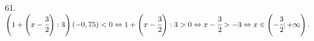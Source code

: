 61. $\left(1+\left(x-\cfrac{3}{2}\right):3\right)\left(-0,75\right)<0\Leftrightarrow1+\left(x-\cfrac{3}{2}\right):3>0\Leftrightarrow
x-\cfrac{3}{2}>-3\Leftrightarrow x\in  \left(-\cfrac{3}{2};+\infty\right).$\\
